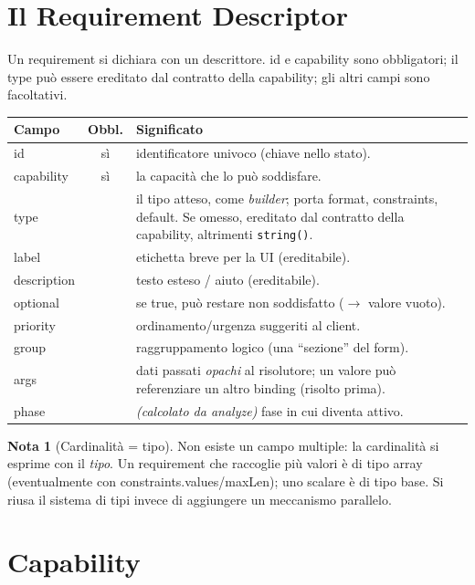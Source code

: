 \documentclass[11pt,a4paper]{book}
\let\code\lstinline
\newcommand{\ic}[1]{{\ttfamily #1}}
\theoremstyle{definition}
\newtheorem*{nota}{Nota}
\begin{document}
{{{{\section{Il Requirement Descriptor}

Un requirement si dichiara con un descrittore. \ic{id} e \ic{capability} sono
obbligatori; il \ic{type} può essere ereditato dal contratto della capability;
gli altri campi sono facoltativi.

\begin{center}
\small
\begin{tabular}{@{}l c p{8.4cm}@{}}
\toprule
\textbf{Campo} & \textbf{Obbl.} & \textbf{Significato} \\
\midrule
\ic{id} & sì & identificatore univoco (chiave nello stato). \\
\ic{capability} & sì & la capacità che lo può soddisfare. \\
\ic{type} & & il tipo atteso, come \emph{builder}; porta format, constraints,
default. Se omesso, ereditato dal contratto della capability, altrimenti
\code|string()|. \\
\ic{label} & & etichetta breve per la UI (ereditabile). \\
\ic{description} & & testo esteso / aiuto (ereditabile). \\
\ic{optional} & & se \ic{true}, può restare non soddisfatto ($\rightarrow$ valore vuoto). \\
\ic{priority} & & ordinamento/urgenza suggeriti al client. \\
\ic{group} & & raggruppamento logico (una ``sezione'' del form). \\
\ic{args} & & dati passati \emph{opachi} al risolutore; un valore può referenziare
un altro binding (risolto prima). \\
\ic{phase} & & \emph{(calcolato da \ic{analyze})} fase in cui diventa attivo. \\
\bottomrule
\end{tabular}
\end{center}

\begin{nota}[Cardinalità = tipo]
Non esiste un campo \ic{multiple}: la cardinalità si esprime con il \emph{tipo}. Un
requirement che raccoglie più valori è di tipo \ic{array} (eventualmente con
\ic{constraints.values}/\ic{maxLen}); uno scalare è di tipo base. Si riusa il
sistema di tipi invece di aggiungere un meccanismo parallelo.
\end{nota}

\section{Capability}

}}}}
\end{document}
